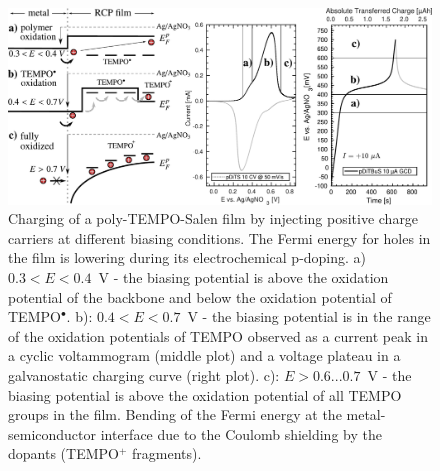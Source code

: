\begin{figure}[!ht]
\center
	\includegraphics[width=1\textwidth]{./electrochemistry/figures/transport_in_film.pdf}
	\caption{Charging of a poly-TEMPO-Salen film by injecting positive charge carriers at different biasing conditions. The Fermi energy for holes in the film is lowering during its electrochemical p-doping. a) $0.3<E<0.4$~V - the biasing potential is above the oxidation potential of the backbone and below the oxidation potential of TEMPO$^{\bullet}$. b): $0.4<E<0.7$~V - the biasing potential is in the range of the oxidation potentials of TEMPO observed as a current peak in a cyclic voltammogram (middle plot) and a voltage plateau in a galvanostatic charging curve (right plot). c): $E>0.6...0.7$~V - the biasing potential is above the oxidation potential of all TEMPO groups in the film. Bending of the Fermi energy at the metal-semiconductor interface due to the Coulomb shielding by the dopants (TEMPO$^+$ fragments).}
	\label{fig:biasing_charging}
\end{figure}
